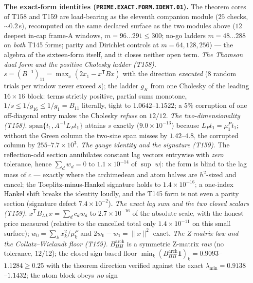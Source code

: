 \par\smallskip\noindent\textbf{The exact-form identities
(\texttt{PRIME.EXACT.FORM.IDENT.01}).}
The theorem cores of T158 and T159 are load-bearing as the eleventh
companion module ($25$ checks, ${\sim}0.2$\,s), recomputed on the same
declared surface as the two modules above ($12$ deepest in-cap frame-A
windows, $m=96\ldots291\le300$; no-go ladders $m=48\ldots288$ on
\emph{both} T145 forms; parity and Dirichlet controls at $m=64,128,256$)
--- the algebra of the sixteen-form itself, and it closes neither open
term.
\emph{The Thomson dual form and the positive Cholesky ladder (T158).}
$s=(B^{-1})_{11}=\max_x(2x_1-x^{\mathsf T}Bx)$ with the direction
\emph{executed} ($8$ random trials per window never exceed $s$); the
ladder $g_K$ from one Cholesky of the leading $16\times16$ block: terms
strictly positive, partial sums monotone, $1/s\le1/g_{16}\le1/g_1=B_{11}$
literally, tight to $1.0642$--$1.1522$; a $5\%$ corruption of one
off-diagonal entry makes the Cholesky \emph{refuse} on $12/12$.
\emph{The two-dimensionality (T158).} $\mathrm{span}\{t_1,A^{-1}L_Pt_1\}$
attains $s$ exactly ($9.0\times10^{-13}$) because $L_Pt_1=\mu^P_1t_1$;
without the Green column the two-sine span misses by $1.42$--$4.8$, the
corrupted column by $255$--$7.7\times10^{3}$.
\emph{The gauge identity and the signature (T159).} The reflection-odd
section annihilates constant lag vectors entrywise with \emph{zero}
tolerance, hence $\sum_dw_d=0$ to $1.1\times10^{-14}$ of $\sup|w|$: the
form is blind to the lag mass of $c$ --- exactly where the archimedean
and atom halves are $h^2$-sized and cancel; the Toeplitz-minus-Hankel
signature holds to $1.4\times10^{-16}$; a one-index Hankel shift breaks
the identity loudly, and the T145 form is not even a parity section
(signature defect $7.4\times10^{-2}$).
\emph{The exact lag sum and the two closed scalars (T159).}
$x^{\mathsf T}B_{LL}x=\sum_dc_dw_d$ to $2.7\times10^{-16}$ of the
absolute scale, with the honest price measured (relative to the
cancelled total only $1.4\times10^{-11}$ on this small surface);
$w_0=\sum_kx_k^2/\mu^P_k$ and $2w_0-w_1=\|x\|^2$ exact.
\emph{The Z-matrix law and the Collatz--Wielandt floor (T159).}
$B^{\mathrm{arch}}_{HH}$ is a symmetric Z-matrix \emph{raw} (no
tolerance, $12/12$); the closed sign-based floor
$\min_k(B^{\mathrm{arch}}_{HH}\mathbf 1)_k=0.9093$--$1.1284\ge0.25$ with
the theorem direction verified against the exact
$\lambda_{\min}=0.9138$--$1.1432$; the atom block obeys \emph{no} sign
